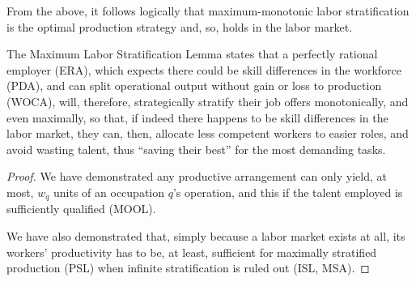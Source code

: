 \documentclass[hidelinks, nonatbib]{elsarticle}
\begin{document}
From the above, it follows logically that maximum-monotonic labor stratification is the optimal production strategy and, so, holds in the labor market.
\begin{lemma}
    \label{mlsl}
    The Maximum Labor Stratification Lemma states that a perfectly rational employer (ERA), which expects there could be skill differences in the workforce (PDA), and can split operational output without gain or loss to production (WOCA), will, therefore, strategically stratify their job offers monotonically, and even maximally, so that, if indeed there happens to be skill differences in the labor market, they can, then, allocate less competent workers to easier roles, and avoid wasting talent, thus ``saving their best'' for the most demanding tasks.

    \begin{proof}
        We have demonstrated any productive arrangement can only yield, at most, $w_q$ units of an occupation $q$'s operation, and this if the talent employed is sufficiently qualified (MOOL).

        We have also demonstrated that, simply because a labor market exists at all, its workers' productivity has to be, at least, sufficient for maximally stratified production (PSL) when infinite stratification is ruled out (ISL, MSA).


\end{proof}
\end{lemma}
\end{document}
